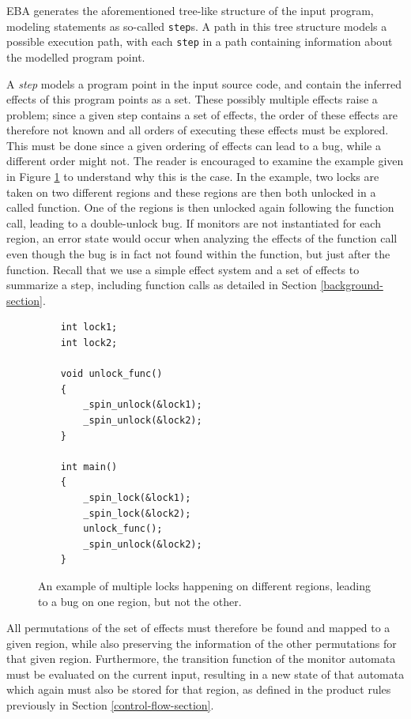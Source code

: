 \newpar EBA generates the aforementioned tree-like structure of the input program, modeling statements as so-called \texttt{step}s. A path in this tree structure models a possible execution path, with each \texttt{step} in a path containing information about the modelled program point. 

\newpar A \textit{step} models a program point in the input source code, and contain the inferred effects of this program points as a set. These possibly multiple effects raise a problem; since a given step contains a set of effects, the order of these effects are therefore not known and all orders of executing these effects must be explored. This must be done since a given ordering of effects can lead to a bug, while a different order might not. The reader is encouraged to examine the example given in Figure \ref{multiple-region-example} to understand why this is the case. In the example, two locks are taken on two different regions and these regions are then both unlocked in a called function. One of the regions is then unlocked again following the function call, leading to a double-unlock bug. If monitors are not instantiated for each region, an error state would occur when analyzing the effects of the function call even though the bug is in fact not found within the function, but just after the function. Recall that we use a simple effect system and a set of effects to summarize a step, including function calls as detailed in Section \ref{background-section}.

\begin{figure}[H]
    \centering
    \begin{verbatim}
    int lock1;
    int lock2;

    void unlock_func()
    {
        _spin_unlock(&lock1);
        _spin_unlock(&lock2);
    }

    int main()
    {
        _spin_lock(&lock1);
        _spin_lock(&lock2);
        unlock_func();
        _spin_unlock(&lock2);
    }
    \end{verbatim}
    \caption{An example of multiple locks happening on different regions, leading to a bug on one region, but not the other.}
    \label{multiple-region-example}
\end{figure}

\noindent All permutations of the set of effects must therefore be found and mapped to a given region, while also preserving the information of the other permutations for that given region. Furthermore, the transition function of the monitor automata must be evaluated on the current input, resulting in a new state of that automata which again must also be stored for that region, as defined in the product rules previously in Section \ref{control-flow-section}.

